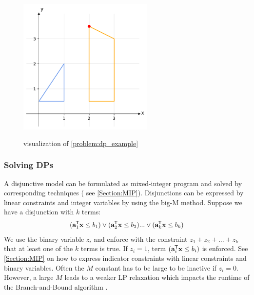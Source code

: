 \begin{figure}[h!]
    \caption{visualization of \cref{problem:dp_example}}
    \centering
    \includegraphics[width=0.6\textwidth]{Images/dp.pdf}
    \label{fig:dp}
\end{figure}

\subsubsection{Solving DPs}
A disjunctive model can be formulated as mixed-integer program and solved by corresponding techniques ( see \cref{Section:MIP}). Disjunctions can be expressed by linear constraints and integer variables by using the big-M method. Suppose we have a disjunction with $k$ terms:
\begin{equation*}
    (\bold a_1 ^{\mkern-1.5mu\mathsf{T}} \bold x \leq b_1) \lor (\bold a_2 ^{\mkern-1.5mu\mathsf{T}} \bold x \leq b_2) ... \lor (\bold a_k ^{\mkern-1.5mu\mathsf{T}} \bold x \leq b_k)
\end{equation*}
We use the binary variable $z_i$ and enforce with the constraint $z_1 +  z_2 + ... + z_k$ that at least one of the $k$ terms is true. If $z_i=1$, term $(\bold a_i ^{\mkern-1.5mu\mathsf{T}} \bold x \leq b_i)$ is enforced. See \cref{Section:MIP} on how to express indicator constraints with linear constraints and binary variables. Often the $M$ constant has to be large to be inactive if $z_i=0$. However, a large $M$ leads to a weaker LP relaxation which impacts the runtime of the Branch-and-Bound algorithm \cite{aps_mosek_nodate}. 

